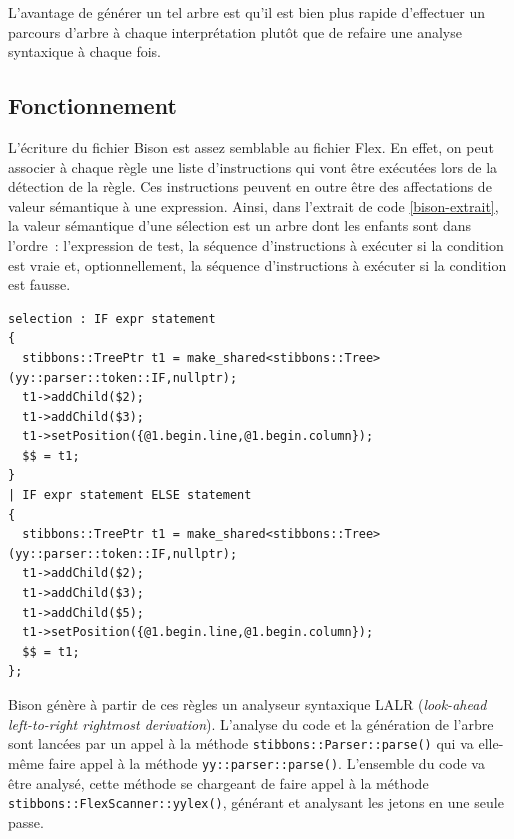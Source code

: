 L'avantage de générer un tel arbre est qu'il est bien plus rapide d'effectuer un parcours d'arbre à chaque interprétation plutôt que de refaire une analyse syntaxique à chaque fois.

\subsection{Fonctionnement}
L'écriture du fichier Bison est assez semblable au fichier Flex. En effet, on peut associer à chaque règle une liste d'instructions qui vont être exécutées lors de la détection de la règle. Ces instructions peuvent en outre être des affectations de valeur sémantique à une expression. Ainsi, dans l'extrait de code \ref{bison-extrait}, la valeur sémantique d'une sélection est un arbre dont les enfants sont dans l'ordre~: l'expression de test, la séquence d'instructions à exécuter si la condition est vraie et, optionnellement, la séquence d'instructions à exécuter si la condition est fausse.

\begin{lstlisting}[label=bison-extrait,caption=Cas du IF en Bison]
selection : IF expr statement 
{
  stibbons::TreePtr t1 = make_shared<stibbons::Tree>(yy::parser::token::IF,nullptr);
  t1->addChild($2);
  t1->addChild($3);
  t1->setPosition({@1.begin.line,@1.begin.column});
  $$ = t1;
}
| IF expr statement ELSE statement
{
  stibbons::TreePtr t1 = make_shared<stibbons::Tree>(yy::parser::token::IF,nullptr);
  t1->addChild($2);
  t1->addChild($3);
  t1->addChild($5);
  t1->setPosition({@1.begin.line,@1.begin.column});
  $$ = t1;
};
\end{lstlisting}

Bison génère à partir de ces règles un analyseur syntaxique LALR (\emph{look-ahead left-to-right rightmost derivation}). L'analyse du code et la génération de l'arbre sont lancées par un appel à la méthode \verb|stibbons::Parser::parse()| qui va elle-même faire appel à la méthode \verb|yy::parser::parse()|. L'ensemble du code va être analysé, cette méthode se chargeant de faire appel à la méthode \verb|stibbons::FlexScanner::yylex()|, générant et analysant les jetons en une seule passe.
